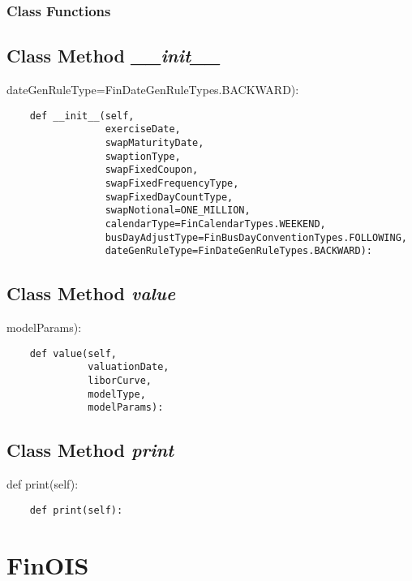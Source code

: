 \documentclass[twoside,11pt]{book}
\begin{document}
\subsubsection{Class Functions}

\subsection{Class Method {\it \_\_init\_\_}}
dateGenRuleType=FinDateGenRuleTypes.BACKWARD):

\begin{lstlisting}
    def __init__(self,
                 exerciseDate,
                 swapMaturityDate,
                 swaptionType,
                 swapFixedCoupon,
                 swapFixedFrequencyType,
                 swapFixedDayCountType,
                 swapNotional=ONE_MILLION,
                 calendarType=FinCalendarTypes.WEEKEND,
                 busDayAdjustType=FinBusDayConventionTypes.FOLLOWING,
                 dateGenRuleType=FinDateGenRuleTypes.BACKWARD):
\end{lstlisting}

\subsection{Class Method {\it value}}
modelParams):

\begin{lstlisting}
    def value(self,
              valuationDate,
              liborCurve,
              modelType,
              modelParams):
\end{lstlisting}

\subsection{Class Method {\it print}}
def print(self):

\begin{lstlisting}
    def print(self):
\end{lstlisting}

\newpage
\section{FinOIS}
\end{document}
